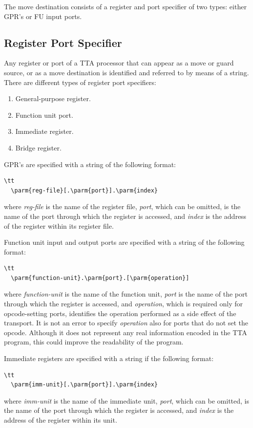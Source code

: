 \documentclass[twoside]{tceusermanual}
\begin{document}
The move destination consists of a register and port specifier of two types:
either GPR's or FU input ports.

\subsection{Register Port Specifier}
\label{ssec:move-terminal}

Any register or port of a TTA processor that can appear as a move or guard
source, or as a move destination is identified and referred to by means of a
string.
%
There are different types of register port specifiers:
\begin{enumerate}
\item %
  General-purpose register.
\item %
  Function unit port.
\item %
  Immediate register.
\item %
  Bridge register.
\end{enumerate}

GPR's are specified with a string of the following format:

\begin{verbatim}\tt
  \parm{reg-file}[.\parm{port}].\parm{index}
\end{verbatim}

where \emph{reg-file} is the name of the register file,
%
%
\emph{port}, which can be omitted, is the name of the port through which the
register is accessed, and \emph{index} is the address of the register within
its register file.

Function unit input and output ports are specified with a string of the
following format:

\begin{verbatim}\tt
  \parm{function-unit}.\parm{port}.[\parm{operation}]
\end{verbatim}

where \emph{function-unit} is the name of the function unit, \emph{port} is
the name of the port through which the register is accessed, and
\emph{operation}, which is required only for opcode-setting ports,
identifies the operation performed as a side effect of the transport.
%
It is not an error to specify \emph{operation} also for ports that do not
set the opcode.  Although it does not represent any real information encoded
in the TTA program, this could improve the readability of the program.

Immediate registers are specified with a string if the following format:
\begin{verbatim}\tt
  \parm{imm-unit}[.\parm{port}].\parm{index}
\end{verbatim}
where \emph{imm-unit} is the name of the immediate unit,
%
%
\emph{port}, which can be omitted, is the name of the port through which the
register is accessed, and \emph{index} is the address of the register within
its unit.
\end{document}
